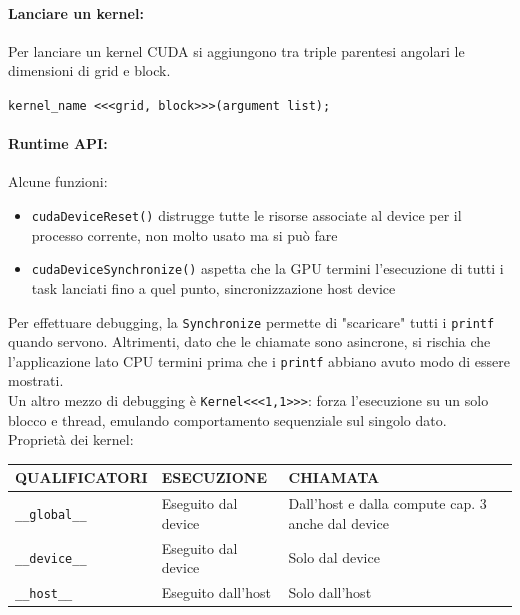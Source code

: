 \paragraph{Lanciare un kernel:} Per lanciare un kernel CUDA si aggiungono tra triple parentesi angolari le dimensioni di grid e block.
\begin{center}
	\texttt{kernel\_name <<<grid, block>>>(argument list);}
\end{center}

\paragraph{Runtime API:} Alcune funzioni:
\begin{itemize}
	\item \texttt{cudaDeviceReset()} distrugge tutte le risorse associate al device per il processo corrente, non molto usato ma si può fare
	\item \texttt{cudaDeviceSynchronize()} aspetta che la GPU termini l'esecuzione di tutti i task lanciati fino a quel punto, sincronizzazione host device
\end{itemize}
Per effettuare debugging, la \texttt{Synchronize} permette di "scaricare" tutti i \texttt{printf} quando servono. Altrimenti, dato che le chiamate sono asincrone, si rischia che l'applicazione lato CPU termini prima che i \texttt{printf} abbiano avuto modo di essere mostrati. \\

Un altro mezzo di debugging è \texttt{Kernel<<<1,1>>>}: forza l'esecuzione su un solo blocco e thread, emulando comportamento sequenziale sul singolo dato.\\

Proprietà dei kernel: 
\begin{center}
	\begin{tabular}{| l | l | p{4cm} |}
		\hline
		\textbf{QUALIFICATORI} & \textbf{ESECUZIONE} & \textbf{CHIAMATA} \\
		\hline
		\texttt{\_\_global\_\_} & Eseguito dal device & Dall’host e dalla compute cap. 3 anche dal device \\
		\hline
		\texttt{\_\_device\_\_} & Eseguito dal device & Solo dal device \\
		\hline
		\texttt{\_\_host\_\_} & Eseguito dall’host & Solo dall’host \\
		\hline
	\end{tabular}
\end{center}


